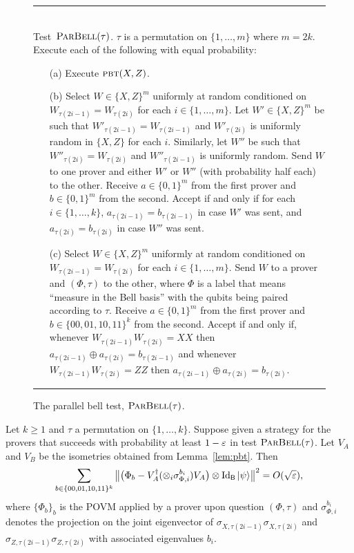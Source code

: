 \begin{figure}[H]
\rule[1ex]{\textwidth}{0.5pt}\\
\justifying
Test~$\textsc{ParBell}(\tau)$. $\tau$ is a permutation on $\{1,\ldots,m\}$ where  $m=2k$. \\
Execute each of the following with equal probability: 
\begin{enumerate}
\item[(a)] Execute $\textsc{pbt}(X,Z)$.
\item[(b)] Select $W\in \{X,Z\}^m$ uniformly at random conditioned on $W_{\tau(2i-1)}=W_{\tau(2i)}$ for each $i\in\{1,\ldots,m\}$. Let $W' \in \{X,Z\}^m$ be such that $W'_{\tau(2i-1)}=W_{\tau(2i-1)}$ and $W'_{\tau(2i)}$ is uniformly random in $\{X,Z\}$ for each $i$. Similarly, let $W''$ be such that $W''_{\tau(2i)}=W_{\tau(2i)}$ and $W''_{\tau(2i-1)}$ is uniformly random. Send $W$ to one prover and either $W'$ or $W''$ (with probability half each) to the other. Receive $a\in\{0,1\}^m$ from the first prover and $b\in\{0,1\}^m$ from the second. Accept if and only if for each $i\in\{1,\ldots,k\}$, $a_{\tau(2i-1)}=b_{\tau(2i-1)}$ in case $W'$ was sent, and $a_{\tau(2i)}=b_{\tau(2i)}$ in case $W''$ was sent.
\item[(c)] Select $W\in \{X,Z\}^m$ uniformly at random conditioned on $W_{\tau(2i-1)}=W_{\tau(2i)}$ for each $i\in\{1,\ldots,m\}$. Send $W$ to a prover and $(\Phi,\tau)$ to the other, where $\Phi$ is a label that means ``measure in the Bell basis'' with the qubits being paired according to $\tau$. Receive $a\in\{0,1\}^m$ from the first prover and $b\in\{00,01,10,11\}^k$ from the second. Accept if and only if, whenever $W_{\tau(2i-1)}W_{\tau(2i)}=XX$ then $a_{\tau(2i-1)}\oplus a_{\tau(2i)}=b_{\tau(2i-1)}$ and whenever $W_{\tau(2i-1)}W_{\tau(2i)}=ZZ$ then $a_{\tau(2i-1)}\oplus a_{\tau(2i)}=b_{\tau(2i)}$.
\end{enumerate}
\rule[2ex]{\textwidth}{0.5pt}\vspace{-.5cm}
\caption{The parallel bell test, $\textsc{ParBell}(\tau)$.}
\label{fig:pbell-test}
\end{figure}

\begin{lemma}\label{lem:perm-test}
Let $k\geq 1$ and $\tau$ a permutation on $\{1,\ldots,k\}$. Suppose given a strategy for the provers that succeeds with probability at least $1-\varepsilon$ in test $\textsc{ParBell}(\tau)$. Let $V_A$ and $V_B$ be the isometries obtained from Lemma~\ref{lem:pbt}. Then 
$$ \sum_{b\in\{00,01,10,11\}^k} \big\|\big(\Phi_b - V_A^\dagger (\otimes_i \sigma_{\Phi,i}^{b_i} ) V_A\big)\otimes \mathop{\rm Id}\nolimits_{{\textsf{B}}}|\psi\rangle \big\|^2 = O(\sqrt{\varepsilon}),$$
where $\{\Phi_b\}_b$ is the POVM applied by a prover upon question $(\Phi,\tau)$ and $\sigma_{\Phi,i}^{b_i}$ denotes the projection on the joint eigenvector of $\sigma_{X,\tau(2i-1)}\sigma_{X,\tau(2i)}$ and $\sigma_{Z,\tau(2i-1)}\sigma_{Z,\tau(2i)}$ with associated eigenvalues $b_i$. 
\end{lemma}

